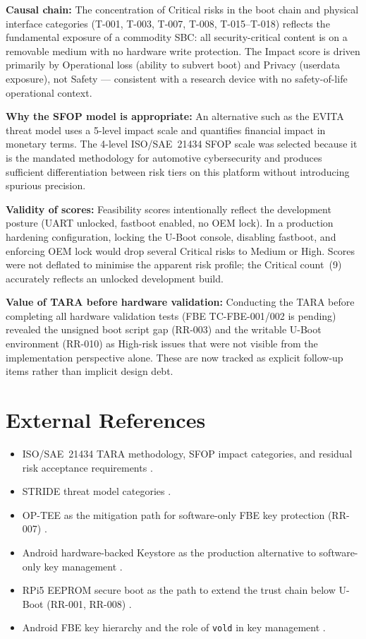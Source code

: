 \textbf{Causal chain:} The concentration of Critical risks in the boot chain and physical interface categories (T-001, T-003, T-007, T-008, T-015--T-018) reflects the fundamental exposure of a commodity SBC: all security-critical content is on a removable medium with no hardware write protection. The Impact score is driven primarily by Operational loss (ability to subvert boot) and Privacy (userdata exposure), not Safety --- consistent with a research device with no safety-of-life operational context.

\textbf{Why the SFOP model is appropriate:} An alternative such as the EVITA threat model uses a 5-level impact scale and quantifies financial impact in monetary terms. The 4-level ISO/SAE~21434 SFOP scale was selected because it is the mandated methodology for automotive cybersecurity and produces sufficient differentiation between risk tiers on this platform without introducing spurious precision.

\textbf{Validity of scores:} Feasibility scores intentionally reflect the development posture (UART unlocked, fastboot enabled, no OEM lock). In a production hardening configuration, locking the U-Boot console, disabling fastboot, and enforcing OEM lock would drop several Critical risks to Medium or High. Scores were not deflated to minimise the apparent risk profile; the Critical count~(9) accurately reflects an unlocked development build.

\textbf{Value of TARA before hardware validation:} Conducting the TARA before completing all hardware validation tests (FBE TC-FBE-001/002 is pending) revealed the unsigned boot script gap (RR-003) and the writable U-Boot environment (RR-010) as High-risk issues that were not visible from the implementation perspective alone. These are now tracked as explicit follow-up items rather than implicit design debt.

\section{External References}
\label{sec:tara_refs}

\begin{itemize}
    \item ISO/SAE~21434 TARA methodology, SFOP impact categories, and residual risk acceptance requirements \cite{iso_sae_21434}.
    \item STRIDE threat model categories \cite{stride_microsoft}.
    \item OP-TEE as the mitigation path for software-only FBE key protection (RR-007) \cite{optee_project}.
    \item Android hardware-backed Keystore as the production alternative to software-only key management \cite{android_keystore_hw}.
    \item RPi5 EEPROM secure boot as the path to extend the trust chain below U-Boot (RR-001, RR-008) \cite{rpi5_eeprom_secure_boot}.
    \item Android FBE key hierarchy and the role of \texttt{vold} in key management
    \cite{android_fbe, android_data_encryption}.
\end{itemize}
